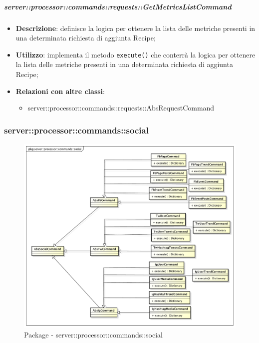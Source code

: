         \subparagraph{server::processor::commands::requests::GetMetricsListCommand} %
        \label{subp:bdsm_app_server_processor_commands_requests_getmetricslistcommand}
        \begin{itemize}
          \item \textbf{Descrizione}: definisce la logica per ottenere la lista delle metriche presenti in una determinata richiesta di aggiunta Recipe;
          \item \textbf{Utilizzo}: implementa il metodo \texttt{execute()} che conterrà la logica per ottenere la lista delle metriche presenti in una determinata richiesta di aggiunta Recipe;
          \item \textbf{Relazioni con altre classi}:
            \begin{itemize}
              \item server::processor::commands::requests::AbsRequestCommand
            \end{itemize}
        \end{itemize}

      \subsubsection{server::processor::commands::social} %
      \label{ssub:bdsm_app_server_processor_commands_social}
      \begin{figure}[!htbp]
      	\centering
      	\centerline{\includegraphics[scale=0.4]{./images/server/social.pdf}}
      	\caption{Package - server::processor::commands::social}
      \end{figure}

